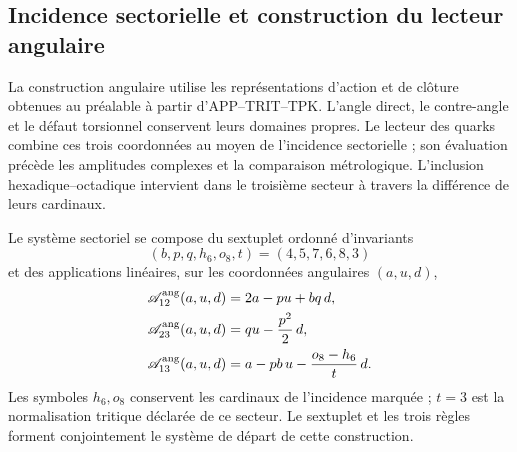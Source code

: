 
\subsection{Incidence sectorielle et construction du lecteur angulaire}
\label{sec:ii09-construccion-sectorial}

La construction angulaire utilise les représentations d’action et de clôture
obtenues au préalable à partir d’APP--TRIT--TPK. L’angle direct, le
contre-angle et le défaut torsionnel conservent leurs domaines propres.
Le lecteur des quarks combine ces trois coordonnées au moyen de l’incidence
sectorielle ; son évaluation précède les amplitudes complexes et la
comparaison métrologique. L’inclusion hexadique--octadique intervient dans
le troisième secteur à travers la différence de leurs cardinaux.





\begin{definition}
\label{def:ii09-sistema-sectorial}
Le système sectoriel se compose du sextuplet ordonné d'invariants
\[
 (b,p,q,h_6,o_8,t)=(4,5,7,6,8,3)
\]
et des applications linéaires, sur les coordonnées angulaires
\((a,u,d)\),
\begin{align}
 \mathscr A_{12}^{\rm ang}(a,u,d)&=2a-pu+bq\,d,\label{eq:ii09-sector12}\\
 \mathscr A_{23}^{\rm ang}(a,u,d)&=qu-\frac{p^2}{2}\,d,\label{eq:ii09-sector23}\\
 \mathscr A_{13}^{\rm ang}(a,u,d)&=a-pb\,u-\frac{o_8-h_6}{t}\,d.
 \label{eq:ii09-sector13}
\end{align}
Les symboles \(h_6,o_8\) conservent les cardinaux de l'incidence
marquée ; \(t=3\) est la normalisation tritique déclarée de ce secteur.
Le sextuplet et les trois règles forment conjointement le système de
départ de cette construction.
\end{definition}

